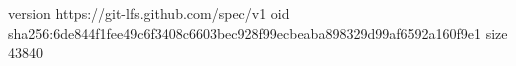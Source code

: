 version https://git-lfs.github.com/spec/v1
oid sha256:6de844f1fee49c6f3408c6603bec928f99ecbeaba898329d99af6592a160f9e1
size 43840
